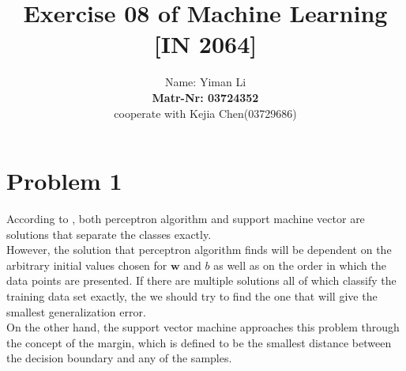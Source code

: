 \documentclass{article}
\title{Exercise 08 of Machine Learning [IN 2064]}
\author{
  Name: Yiman Li \\
  \textbf{Matr-Nr: 03724352} \\
  cooperate with Kejia Chen(03729686)\\
}
\begin{document}
\maketitle

\section*{Problem 1}
According to \cite{bishop2007}, both perceptron algorithm and support machine vector are solutions that separate the classes exactly.\\
However, the solution that perceptron algorithm finds will be dependent on the arbitrary initial values chosen for $\bm{w}$ and $b$ as well as on the order in which the data points are presented. If there are multiple solutions all of which classify the training data set exactly, the we should try to find the one that will give the smallest generalization error.\\
On the other hand, the support vector machine approaches this problem through the concept of the margin, which is defined to be the smallest distance between the decision boundary and any of the samples.
\end{document}
